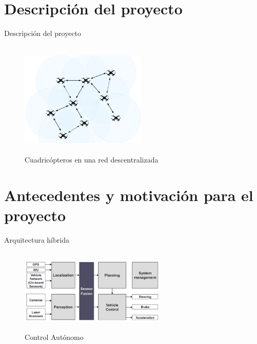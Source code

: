 \documentclass[
	11pt, %
	aspectratio=169, %
]{beamer}
\begin{document}
\section{Descripción del proyecto}
\begin{frame}{Descripción del proyecto}
  
  \begin{figure}
    \centering
    \includegraphics[width=6cm, height=5.5cm]{multiuab}
    \caption[Caption for LOF]{Cuadric\'{o}pteros en una red descentralizada\protect\footnotemark}
  \end{figure}
    
      
\end{frame}

\section{Antecedentes y motivación para el proyecto}
\begin{frame}{Arquitectura híbrida}
  \begin{figure}
    \centering
    \includegraphics[width=7cm, height=4cm]{control_autonomo}
    \caption[Caption for LOF]{Control Aut\'{o}nomo\protect\footnotemark}
  \end{figure}
\end{frame}
\end{document}
